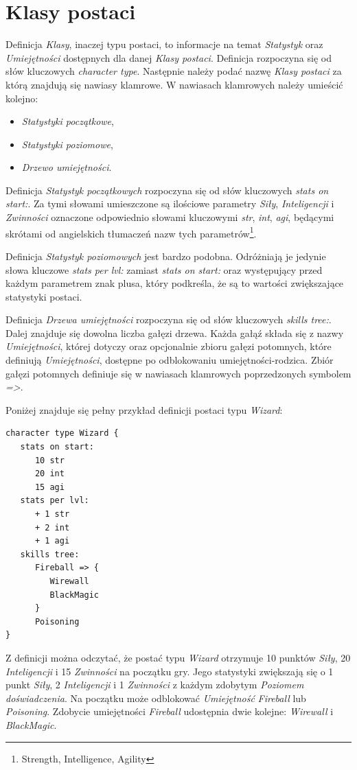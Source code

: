 \documentclass[openright]{xmgr}
\begin{document}
\section{Klasy postaci}
Definicja \textit{Klasy}, inaczej typu postaci, to informacje na temat \textit{Statystyk} oraz \textit{Umiejętności} dostępnych dla danej \textit{Klasy postaci}. Definicja rozpoczyna się od słów kluczowych \textit{character type}. Następnie należy podać nazwę \textit{Klasy postaci} za którą znajdują się nawiasy klamrowe. W nawiasach klamrowych należy umieścić kolejno:
\begin{itemize}
	\item \textit{Statystyki początkowe},
	\item \textit{Statystyki poziomowe},
	\item \textit{Drzewo umiejętności}.
\end{itemize}

Definicja \textit{Statystyk początkowych} rozpoczyna się od słów kluczowych \textit{stats on start:}. Za tymi słowami umieszczone są ilościowe parametry \textit{Siły}, \textit{Inteligencji} i \textit{Zwinności} oznaczone odpowiednio słowami kluczowymi \textit{str}, \textit{int}, \textit{agi}, będącymi skrótami od angielskich tłumaczeń nazw tych parametrów\footnote{Strength, Intelligence, Agility}.

Definicja \textit{Statystyk poziomowych} jest bardzo podobna. Odróżniają je jedynie słowa kluczowe \textit{stats per lvl:} zamiast  \textit{stats on start:} oraz występujący przed każdym parametrem znak plusa, który podkreśla, że są to wartości zwiększające statystyki postaci. 

Definicja \textit{Drzewa umiejętności} rozpoczyna się od słów kluczowych \textit{skills tree:}. Dalej znajduje się dowolna liczba gałęzi drzewa.
Każda gałąź składa się z nazwy \textit{Umiejętności}, której dotyczy oraz opcjonalnie zbioru gałęzi potomnych, które definiują \textit{Umiejętności}, dostępne po odblokowaniu umiejętności-rodzica.
Zbiór gałęzi potomnych definiuje się w nawiasach klamrowych poprzedzonych symbolem \textit{=>}. 

Poniżej znajduje się pełny przykład definicji postaci typu \textit{Wizard}:
\begin{verbatim}
character type Wizard {
   stats on start:
      10 str
      20 int
      15 agi
   stats per lvl:
      + 1 str
      + 2 int
      + 1 agi
   skills tree:
      Fireball => {
         Wirewall
         BlackMagic
      }
      Poisoning
}
\end{verbatim}
Z definicji można odczytać, że postać typu \textit{Wizard} otrzymuje 10 punktów \textit{Siły}, 20 \textit{Inteligencji} i 15 \textit{Zwinności} na początku gry.
Jego statystyki zwiększają się o 1 punkt \textit{Siły}, 2 \textit{Inteligencji} i 1 \textit{Zwinności} z każdym zdobytym \textit{Poziomem doświadczenia}.
Na początku może odblokować \textit{Umiejętność} \textit{Fireball} lub \textit{Poisoning}. Zdobycie umiejętności \textit{Fireball} udostępnia dwie kolejne: \textit{Wirewall} i \textit{BlackMagic}. 
\end{document}
